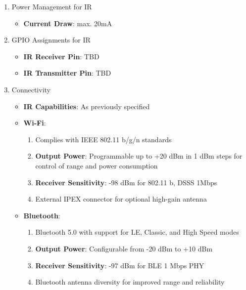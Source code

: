 \documentclass[conference]{IEEEtran}
\begin{document}
\begin{enumerate}[label=\arabic*.]
\begin{enumerate}[label=\alph*.]
\item Power Management for IR\\
\begin{itemize}
\item \textbf{Current Draw}: max. 20mA\\
\end{itemize}

\item GPIO Assignments for IR\\
\begin{itemize}
\item \textbf{IR Receiver Pin}: TBD\\
\item \textbf{IR Transmitter Pin}: TBD\\
\end{itemize}

\item Connectivity\\
\begin{itemize}
\item \textbf{IR Capabilities}: As previously specified\\
\item \textbf{Wi-Fi}:\\
\begin{enumerate}[label=\roman*.]
\item Complies with IEEE 802.11 b/g/n standards\\
\item \textbf{Output Power}: Programmable up to +20 dBm in 1 dBm steps for control of range and power consumption\\
\item \textbf{Receiver Sensitivity}: -98 dBm for 802.11 b, DSSS 1Mbps\\
\item External IPEX connector for optional high-gain antenna\\
\end{enumerate}
\item \textbf{Bluetooth}:\\
\begin{enumerate}[label=\roman*.]
\item Bluetooth 5.0 with support for LE, Classic, and High Speed modes\\
\item \textbf{Output Power}: Configurable from -20 dBm to +10 dBm\\
\item \textbf{Receiver Sensitivity}: -97 dBm for BLE 1 Mbps PHY\\
\item Bluetooth antenna diversity for improved range and reliability\\
\end{enumerate}
\end{itemize}
\end{enumerate}



\end{enumerate}
\end{document}
